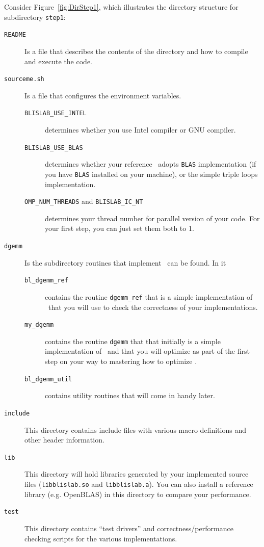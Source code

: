 Consider Figure~\ref{fig:DirStep1}, which illustrates the directory
structure for subdirectory {\tt step1}:
\begin{description}
\item[{\tt README}]
Is a file that describes the contents of the directory and how to compile and execute the code.
\item[{\tt sourceme.sh}]
Is a file that configures the environment variables.
\begin{description}
\item[{\tt BLISLAB\_USE\_INTEL}] determines whether you use Intel compiler or GNU compiler.
\item[{\tt BLISLAB\_USE\_BLAS}] determines whether your reference \Gemm\ adopts {\tt BLAS} implementation (if you have {\tt BLAS} installed on your machine), or the simple triple loops implementation.
 \item[{\tt OMP\_NUM\_THREADS} and {\tt BLISLAB\_IC\_NT}] determines your thread number for parallel version of your code. For your first step, you can just set them both to 1.
\end{description}
\item[{\tt dgemm}]
Is the subdirectory routines that implement \Gemm\ can be found.
In it
\begin{description}
\item[{\tt bl\_dgemm\_ref}] contains the routine {\tt dgemm\_ref} that
  is a simple implementation of \Gemm\ that you will use to check the
  correctness of your implementations.
\item[{\tt my\_dgemm}] contains the routine {\tt dgemm} that
  that initially is a simple implementation of \Gemm\ and that you will optimize as part of the first step on your way to mastering how to optimize \Gemm.
\item[{\tt bl\_dgemm\_util}] contains utility routines that will come in handy later.
\end{description}
\item[{\tt include}]
This directory contains 
include files with various macro definitions and 
other header information.
\item[{\tt lib}] This directory will hold libraries generated by your implemented source files ({\tt libblislab.so} and {\tt libblislab.a}). You can also install a reference library (e.g. OpenBLAS) in this directory to
compare your performance.
\item[{\tt test}] This directory contains ``test drivers'' and correctness/performance checking scripts for the various implementations.

\end{description}
